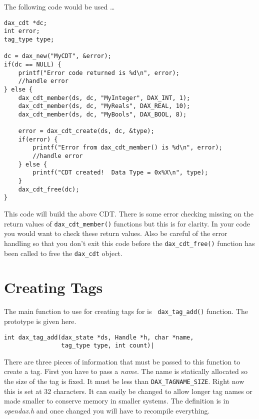 The following code would be used \ldots

\begin{verbatim}
dax_cdt *dc;
int error;
tag_type type;

dc = dax_new("MyCDT", &error);
if(dc == NULL) {
    printf("Error code returned is %d\n", error);
    //handle error
} else {
    dax_cdt_member(ds, dc, "MyInteger", DAX_INT, 1);
    dax_cdt_member(ds, dc, "MyReals", DAX_REAL, 10);
    dax_cdt_member(ds, dc, "MyBools", DAX_BOOL, 8);

    error = dax_cdt_create(ds, dc, &type);
    if(error) {
        printf("Error from dax_cdt_member() is %d\n", error);
	    //handle error
    } else {
        printf("CDT created!  Data Type = 0x%X\n", type);
    }
    dax_cdt_free(dc);
}

\end{verbatim}

This code will build the above CDT.  There is some error checking missing on the return values of \verb|dax_cdt_member()| functions but this is for clarity.  In your code you would want to check these return values.  Also be careful of the error handling so that you don't exit this code before the \verb|dax_cdt_free()| function has been called to free the \verb|dax_cdt| object.



\section{Creating Tags}
The main function to use for creating tags for \opendax is \verb| dax_tag_add()| function.  The prototype is given here.

\begin{verbatim}
int dax_tag_add(dax_state *ds, Handle *h, char *name,
                tag_type type, int count)|
\end{verbatim}

There are three pieces of information that must be passed to this function to create a tag.  First you have to pass a \emph{name}.  The name is statically allocated so the size of the tag is fixed.  It must be less than \verb|DAX_TAGNAME_SIZE|.  Right now this is set at 32 characters.  It can easily be changed to allow longer tag names or made smaller to conserve memory in smaller systems.  The definition is in \emph{opendax.h} and once changed you will have to recompile everything.

